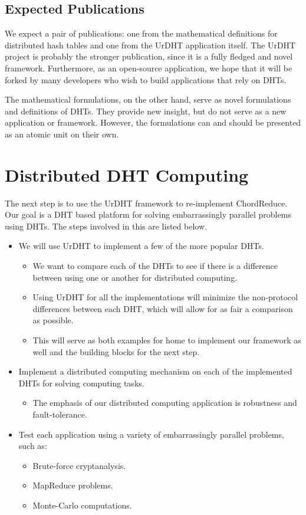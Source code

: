 \subsection{Expected Publications}
We expect a pair of publications: one from the mathematical definitions for distributed hash tables and one from the UrDHT application itself.
The UrDHT project is probably the stronger publication, since it is a fully fledged and novel framework.
Furthermore, as an open-source application, we hope that it will be forked by many developers who wish to build applications that rely on DHTs.

The mathematical formulations, on the other hand, serve as novel formulations and definitions of DHTs.
They provide new insight, but do not serve as a new application or framework.
However, the formulations can and should be presented as an atomic unit on their own.


\section{Distributed DHT Computing}

The next step is to use the UrDHT framework to re-implement ChordReduce.
Our goal is a DHT based platform for solving embarrassingly parallel problems using DHTs.
The steps involved in this are listed below.
\begin{itemize}
	\item We will use UrDHT to implement a few of the more popular DHTs.
	\begin{itemize}
		\item We want to compare each of the DHTs to see if there is a difference between using one or another for distributed computing.
		\item Using UrDHT for all the implementations will minimize the non-protocol differences between each DHT, which will allow for as fair a comparison as possible.
		\item This will serve as both examples for home to implement our framework as well and the building blocks for the next step. 
	\end{itemize}
	\item Implement a distributed computing mechanism on each of the implemented DHTs for solving computing tasks.
	\begin{itemize}
		\item The emphasis of our distributed computing application is robustness and fault-tolerance.
	\end{itemize}
	\item Test each application using a variety of embarrassingly parallel problems, such as:
	\begin{itemize}
		\item Brute-force cryptanalysis.
		\item MapReduce problems.
		\item Monte-Carlo computations.
	\end{itemize}
\end{itemize}

